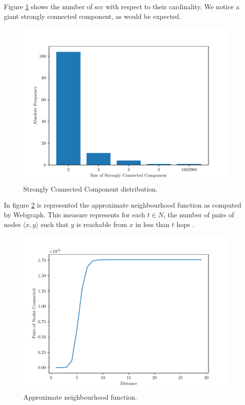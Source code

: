 \documentclass[9pt,a4paper,twocolumn]{article}
\begin{document}
Figure \ref{fig:sccdist} shows the number of \acrshort{scc} with respect to their cardinality. We notice a giant strongly connected component, as would be expected.

\begin{figure}[h]
	\centering
	\includegraphics[width=\linewidth]{wikipedia_pt_sccdistr.pdf}
	\caption{Strongly Connected Component distribution.}
	\label{fig:sccdist}
\end{figure}

In figure \ref{fig:neighfun} is represented the approximate neighbourhood function as computed by Webgraph. This measure represents for each $t \in N$, the number of pairs of nodes $ \langle x, y \rangle $ such that $y$ is reachable from $x$ in less than $t$ hops \cite{Boldi2011HyperANFAT}.

\begin{figure}[h]
	\centering
	\includegraphics[width=\linewidth]{wikipedia_pt_neighbourhood_function.pdf}
	\caption{Approximate neighbourhood function.}
	\label{fig:neighfun}
\end{figure}
\end{document}
